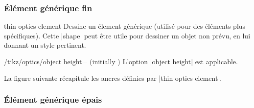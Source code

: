 \documentclass[a4paper]{ltxdoc}
\begin{document}
\subsubsection{Élément générique fin}

\begin{shape}{thin optics element}
Dessine un élement générique (utilisé pour des éléments plus spécifiques). 
Cette |shape| peut être utile pour dessiner un objet non prévu, en lui donnant un style pertinent.

\begin{codeexample}[width=6cm]
\end{codeexample}

\begin{key}{/tikz/optics/object height= (initially )}
    L'option |object height| est applicable.
\end{key}

La figure suivante récapitule les ancres définies par |thin optics element|.

\begin{codeexample}[]
\Huge
{}
\end{codeexample}

\end{shape}

\subsubsection{Élément générique épais}
\end{document}
